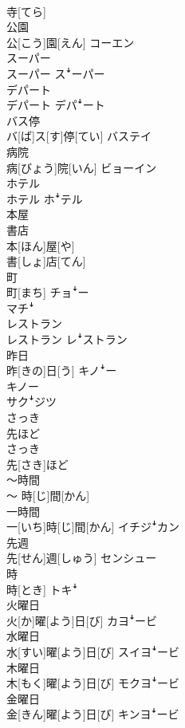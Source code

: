 \documentclass[8pt]{extreport}
\begin{document}
\begin{CJK}{UTF8}{min}
\\	寺[てら]	
\\	公園	
\\	公[こう]園[えん]	コーエン
\\	スーパー	
\\	スーパー	スꜜーパー
\\	デパート	
\\	デパート	デパꜜート
\\	バス停	
\\	バ[ば]ス[す]停[てい]	バステイ
\\	病院	
\\	病[びょう]院[いん]	ビョーイン
\\	ホテル	
\\	ホテル	ホꜜテル
\\	本屋 
\\	書店	
\\	本[ほん]屋[や] 
\\	書[しょ]店[てん]	
\\	町	
\\	町[まち]	チョꜜー 
\\	マチꜜ
\\	レストラン	
\\	レストラン	レꜜストラン
\\	昨日	
\\	昨[きの]日[う]	キノꜜー 
\\	キノー 
\\	サクꜜジツ
\\	さっき 
\\	先ほど	
\\	さっき 
\\	先[さき]ほど	
\\	〜時間	
\\	〜 時[じ]間[かん]	
\\	一時間	
\\	一[いち]時[じ]間[かん]	イチジꜜカン
\\	先週	
\\	先[せん]週[しゅう]	センシュー
\\	時	
\\	時[とき]	トキꜜ
\\	火曜日	
\\	火[か]曜[よう]日[び]	カヨꜜービ
\\	水曜日	
\\	水[すい]曜[よう]日[び]	スイヨꜜービ
\\	木曜日	
\\	木[もく]曜[よう]日[び]	モクヨꜜービ
\\	金曜日	
\\	金[きん]曜[よう]日[び]	キンヨꜜービ

\end{CJK}
\end{document}
